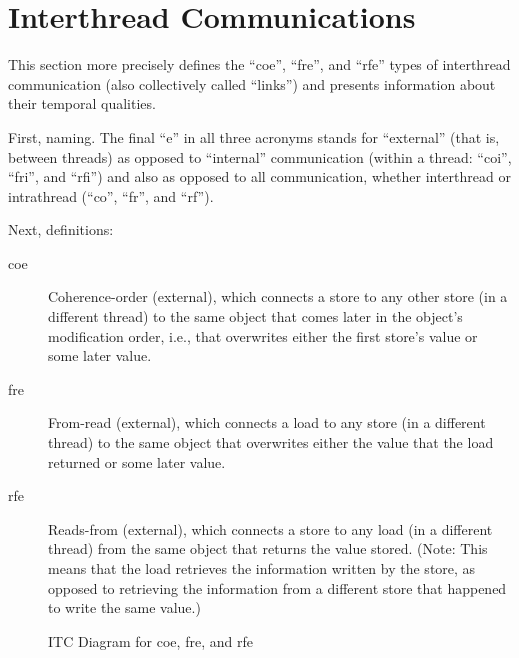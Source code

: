 \documentclass[10]{article}
\begin{document}
\clearpage
\appendix

\section{Interthread Communications}
\label{app:Interthread Communications}

This section more precisely defines the ``coe'', ``fre'', and ``rfe''
types of interthread communication (also collectively called ``links'')
and presents information about their temporal qualities.

First, naming.
The final ``e'' in all three acronyms stands for ``external'' (that
is, between threads) as opposed to ``internal'' communication (within
a thread: ``coi'', ``fri'', and ``rfi'') and also as opposed to all
communication, whether interthread or intrathread (``co'', ``fr'', and
``rf'').

Next, definitions:
\begin{description}
\item[coe]
	Coherence-order (external), which connects a store to any other store
	(in a different thread)
	to the same object that comes later in the object's
	modification order, i.e., that overwrites either the first store's
	value or some later value.
\item[fre]
	From-read (external), which connects a load to any store
	(in a different thread) to
	the same object that overwrites either the value that the load
	returned or some later value.
\item[rfe]
	Reads-from (external), which connects a store to any load
	(in a different thread) from
	the same object that returns the value stored.
	(Note: This means that the load retrieves the information
	written by the store, as opposed to retrieving the information
	from a different store that happened to write the same value.)
\end{description}

\begin{figure}[tb]
\begin{center}
\caption{ITC Diagram for coe, fre, and rfe}
\label{fig:ITC Diagram for coe, fre, and rfe}
\end{center}
\end{figure}
\end{document}
